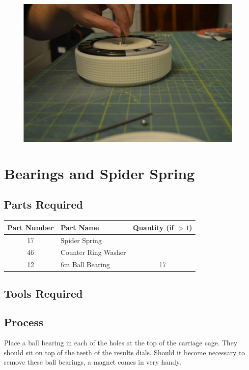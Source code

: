 \documentclass[openany]{book}
\begin{document}
\begin{figure}[!ht]
	\centering
	\includegraphics[width=.75\textwidth]{images/image27.jpg}
	\caption{}
	\label{fig:image27}	
\end{figure}



\chapter{Bearings and Spider Spring}
\section{Parts Required}
\begin{table}[!ht]
	\centering
	\begin{tabular}{clc}
		Part Number & Part Name & Quantity (if $>1$) \\ \hline
		 17 & Spider Spring & \\ 
		 46 & Counter Ring Washer & \\ \hline \hline 
		 12 & 6m Ball Bearing & 17 
	\end{tabular}
\end{table}


\section{Tools Required}

\section{Process}
Place a ball bearing in each of the holes at the top of the carriage cage. They should sit on top of the teeth of the results dials. Should it become necessary to remove these ball bearings, a magnet comes in very handy.
\end{document}
